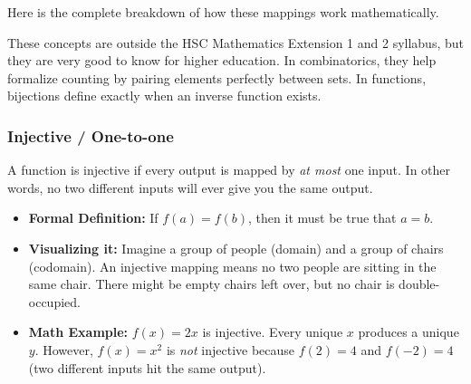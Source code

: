 \documentclass[12pt]{article}
\newenvironment{remark}[1][]{%
  \begin{remarkbox}[title={\bfseries Remark~\thetcbcounter\ifx\relax#1\relax\else\ (#1)\fi}]%
}{%
  \end{remarkbox}%
}
\begin{document}
Here is the complete breakdown of how these mappings work mathematically.

\begin{remark}[Syllabus Note]
These concepts are outside the HSC Mathematics Extension 1 and 2 syllabus, but they are very good to know for higher education. In combinatorics, they help formalize counting by pairing elements perfectly between sets. In functions, bijections define exactly when an inverse function exists.
\end{remark}

\subsubsection*{Injective / One-to-one}
A function is injective if every output is mapped by \emph{at most} one input. In other words, no two different inputs will ever give you the same output. 

\begin{center}
\end{center}

\begin{itemize}[leftmargin=*]
  \item \textbf{Formal Definition:} If $f(a) = f(b)$, then it must be true that $a = b$.
  \item \textbf{Visualizing it:} Imagine a group of people (domain) and a group of chairs (codomain). An injective mapping means no two people are sitting in the same chair. There might be empty chairs left over, but no chair is double-occupied.
  \item \textbf{Math Example:} $f(x) = 2x$ is injective. Every unique $x$ produces a unique $y$. However, $f(x) = x^2$ is \emph{not} injective because $f(2) = 4$ and $f(-2) = 4$ (two different inputs hit the same output).
\end{itemize}
\end{document}
